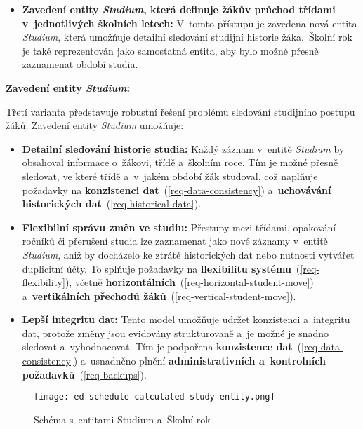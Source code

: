 \begin{enumerate}
\begin{itemize}
        \item \textbf{Zavedení entity \textit{Studium}, která definuje žákův průchod třídami v~jednotlivých školních letech:} V~tomto přístupu je zavedena nová entita \textit{Studium}, která umožňuje detailní sledování studijní historie žáka.~Školní rok je také reprezentován jako samostatná entita, aby bylo možné přesně zaznamenat období studia.
    \end{itemize}
    \textbf{Zavedení entity \textit{Studium}:}

    Třetí varianta představuje robustní řešení problému sledování studijního postupu žáků. Zavedení entity \textit{Studium} umožňuje:

    \begin{itemize}
        \item \textbf{Detailní sledování historie studia:} Každý záznam v~entitě \textit{Studium} by obsahoval informace o~žákovi, třídě a~školním roce. Tím je možné přesně sledovat, ve které třídě a~v~jakém období žák studoval, což naplňuje požadavky na \textbf{konzistenci dat}~(\ref{req-data-consistency}) a~\textbf{uchovávání historických dat}~(\ref{req-historical-data}).

        \item \textbf{Flexibilní správu změn ve studiu:} Přestupy mezi třídami, opakování ročníků či přerušení studia lze zaznamenat jako nové záznamy v~entitě \textit{Studium}, aniž by docházelo ke ztrátě historických dat nebo nutnosti vytvářet duplicitní účty. To splňuje požadavky na \textbf{flexibilitu systému}~(\ref{req-flexibility}), včetně \textbf{horizontálních}~(\ref{req-horizontal-student-move}) a~\textbf{vertikálních přechodů žáků}~(\ref{req-vertical-student-move}).

        \item \textbf{Lepší integritu dat:} Tento model umožňuje udržet konzistenci a~integritu dat, protože změny jsou evidovány strukturovaně a~je možné je snadno sledovat a~vyhodnocovat. Tím je podpořena \textbf{konzistence dat}~(\ref{req-data-consistency}) a~usnadněno plnění \textbf{administrativních a~kontrolních požadavků}~(\ref{req-backups}).
    \end{itemize}

    \begin{figure}[H]
        \centering
        \texttt{[image: ed-schedule-calculated-study-entity.png]}
        \caption{Schéma s~entitami Studium a~Školní rok}
        \label{fig:ed-schedule-calculated-study-entity}
    \end{figure}


\end{enumerate}
